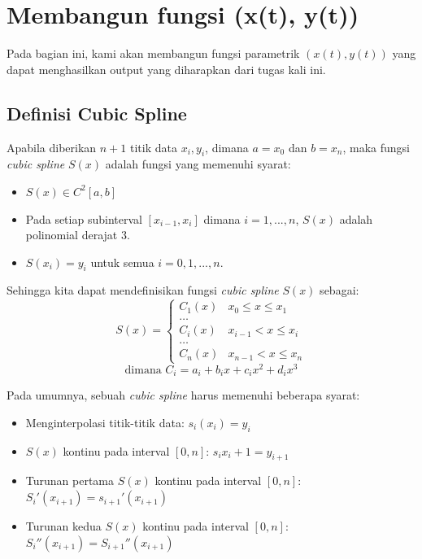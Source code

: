 \documentclass[journal,12pt,onecolumn,a4paper]{IEEEtran}
\begin{document}
\pagebreak

\section{Membangun fungsi (x(t), y(t))}
Pada bagian ini, kami akan membangun fungsi parametrik \((x(t), y(t))\) yang dapat menghasilkan output yang diharapkan dari tugas kali ini.

\subsection{Definisi Cubic Spline}
Apabila diberikan \(n + 1\) titik data \(x_i, y_i\), dimana \(a = x_0\) dan \(b = x_n\), maka fungsi \emph{cubic spline} \(S(x)\) adalah fungsi yang memenuhi syarat:
\begin{itemize}
	\item \(S(x) \in C^2[a, b]\)
	\item Pada setiap subinterval \([x_{i - 1}, x_i]\) dimana \(i = 1, ..., n\), \(S(x)\) adalah polinomial derajat 3.
	\item \(S(x_i) = y_i\) untuk semua \(i = 0, 1, ..., n\).
\end{itemize}

Sehingga kita dapat mendefinisikan fungsi \emph{cubic spline} \(S(x)\) sebagai:
\begin{equation}
	S(x) = \begin{cases}
		C_1(x) & x_0 \leq x \leq x_1  \\
		\dots                         \\
		C_i(x) & x_{i-1} < x \leq x_i \\
		\dots                         \\
		C_n(x) & x_{n-1} < x \leq x_n
	\end{cases}
\end{equation}
\begin{equation}
	\text{dimana }C_i = a_i + b_ix + c_ix^2 + d_ix^3
\end{equation}

Pada umumnya, sebuah \emph{cubic spline} harus memenuhi beberapa syarat:
\begin{itemize}
	\item Menginterpolasi titik-titik data: \(s_i(x_i) = y_i\)
	\item \(S(x)\) kontinu pada interval \([0, n]\): \(s_i{x_i+1} = y_{i + 1}\)
	\item Turunan pertama \(S(x)\) kontinu pada interval \([0, n]\): \(S_i'(x_{i + 1}) = s_{i + 1}'(x_{i + 1})\)
	\item Turunan kedua \(S(x)\) kontinu pada interval \([0, n]\): \(S_i''(x_{i + 1}) = S_{i + 1}''(x_{i + 1})\)
\end{itemize}
\end{document}
